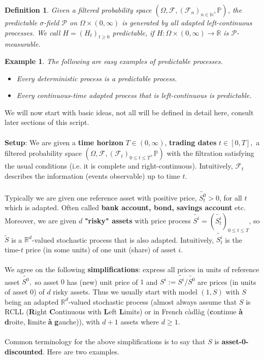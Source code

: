 \documentclass[12pt,a4paper, twoside]{article}
\newtheorem{defn}{Definition}[section]
\newtheorem{exmp}{Example}[section]
\theoremstyle{definition}
\begin{document}
\begin{defn} Given a filtered probability space $(\Omega, \mathcal{F}, ( \mathcal{F}_n)_{n \in \mathbb{N}}, \mathbb{P})$, the predictable $\sigma$-field $\mathcal{P}$ on $\Omega \times (0, \infty)$ is generated by all adapted left-continuous processes. We call $H=(H_t)_{t \geq 0}$ predictable, if $H: \Omega \times (0, \infty) \to \mathbb{R}$ is $\mathcal{P}$-measurable.
\end{defn}
\begin{exmp} The following are easy examples of predictable processes.
\begin{itemize}
\item Every deterministic process is a predictable process.
\item Every continuous-time adapted process that is left-continuous is predictable.
\end{itemize}
\end{exmp}
We will now start with basic ideas, not all will be defined in detail here, consult later sections of this script. 
\\\\
\textbf{Setup}: We are given a \textbf{time horizon} $T \in (0, \infty)$, \textbf{trading dates} $t \in [0,T],$ a filtered probability space $( \Omega, \mathcal{F}, ( \mathcal{F}_t)_{0 \leq t \leq T}, \mathbb{P})$ with the filtration satisfying the usual conditions (i.e. it is complete and right-continuous). Intuitively, $\mathcal{F}_t$ describes the information (events observable) up to time $t.$ 
\\\\
Typically we are given one reference asset with positive price, $\widetilde{S_t^0}>0$, for all $t$ which is adapted. Often called \textbf{bank account, bond, savings account} etc. Moreover, we are given $d$ \textbf{"risky" assets} with price process $\widetilde{S^i}=(\widetilde{S_t^i})_{0 \leq t \leq T}$, so $\widetilde{S}$ is a $\mathbb{R}^d$-valued stochastic process that is also adapted. Intuitively, $\widetilde{S_t^i}$ is the time-$t$ price (in some units) of one unit (share) of asset $i$.
\\\\
We agree on the following \textbf{simplifications}: express all prices in units of reference asset $\widetilde{S^0},$ so asset $0$ has (new) unit price of $1$ and $S^i:= \widetilde{S^i}/\widetilde{S^0}$ are prices (in units of asset $0$) of $d$ risky assets. Thus we usually start with model $(1,S)$ with $S$ being an adapted $\mathbb{R}^d$-valued stochastic process (almost always assume that $S$ is RCLL (\textbf{R}ight \textbf{C}ontinuous with \textbf{L}eft \textbf{L}imits) or in French càdlàg (\textbf{c}ontinue \textbf{à} \textbf{d}roite, \textbf{l}imite \textbf{à} \textbf{g}auche)), with $d+1$ assets where $d \geq 1$. 
\\\\
Common terminology for the above simplifications is to say that $S$ is \textbf{asset-0-discounted}.
\newpage
Here are two examples.
\end{document}
